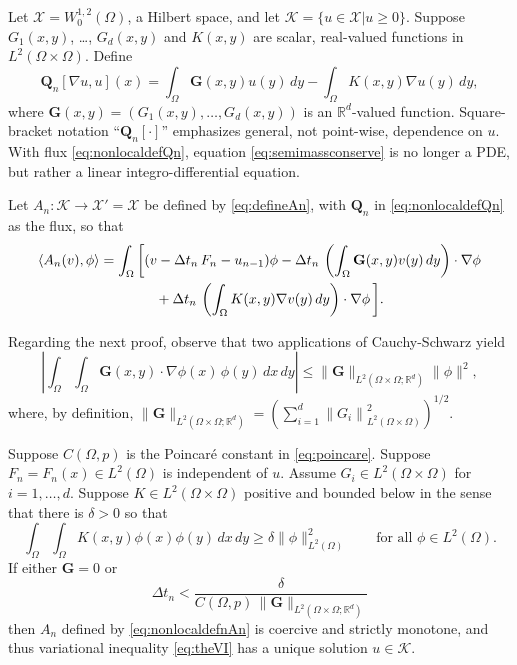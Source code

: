 \documentclass[final,onefignum]{siamart190516}
\newcommand\bG{\mathbf{G}}
\newcommand\bQ{\mathbf{Q}}
\newcommand{\grad}{\nabla}
\newcommand{\ip}[2]{\ensuremath{\left<#1,#2\right>}}
\newcommand\RR{\mathbb{R}}
\begin{document}
Let $\mathcal{X} = W_0^{1,2}(\Omega)$, a Hilbert space, and let $\mathcal{K}=\{u\in\mathcal{X}|u\ge 0\}$.  Suppose $G_1(x,y)$, \dots, $G_d(x,y)$ and $K(x,y)$ are scalar, real-valued functions in $L^2(\Omega\times \Omega)$.  Define
\begin{equation}
\bQ_n[\grad u,u](x) = \int_\Omega \bG(x,y) u(y)\,dy - \int_\Omega K(x,y) \grad u(y)\,dy, \label{eq:nonlocaldefQn}
\end{equation}
where $\bG(x,y) = (G_1(x,y), \dots, G_d(x,y))$ is an $\RR^d$-valued function.  Square-bracket notation ``$\bQ_n[\cdot]$'' emphasizes general, not point-wise, dependence on $u$.  With flux \eqref{eq:nonlocaldefQn}, equation \eqref{eq:semimassconserve} is no longer a PDE, but rather a linear integro-differential equation.

Let $A_n:\mathcal{K} \to \mathcal{X}'=\mathcal{X}$ be defined by \eqref{eq:defineAn}, with $\bQ_n$ in \eqref{eq:nonlocaldefQn} as the flux, so that
\begin{align}
    \ip{A_n(v)}{\phi} &= \int_\Omega \bigg[(v - \Delta t_n\,F_n - u_{n-1})\phi - \Delta t_n\,\left(\int_\Omega \bG(x,y) v(y)\,dy\right)\cdot \grad \phi \label{eq:nonlocaldefnAn} \\
                      &\qquad\qquad + \Delta t_n\,\left(\int_\Omega K(x,y) \grad v(y)\,dy\right)\cdot \grad \phi\,\bigg]. \notag
\end{align}

Regarding the next proof, observe that two applications of Cauchy-Schwarz yield
\begin{equation}
\left|\int_\Omega \int_\Omega \bG(x,y) \cdot \grad \phi(x)\,\phi(y) \,dx\,dy\right|
  \le \|\bG\|_{L^2(\Omega\times\Omega;\RR^d)} \|\phi\|^2,   \label{eq:nonlocalGbound}
\end{equation}
where, by definition, $\|\bG\|_{L^2(\Omega\times\Omega;\RR^d)} = \left(\sum_{i=1}^d \left\|G_i\right\|_{L^2(\Omega \times \Omega)}^2\right)^{1/2}$.

\begin{theorem}  \label{thm:nonlocalwellposed}  Suppose $C(\Omega,p)$ is the Poincar\'e constant in \eqref{eq:poincare}.  Suppose $F_n=F_n(x) \in L^2(\Omega)$ is independent of $u$.  Assume $G_i \in L^2(\Omega\times\Omega)$ for $i=1,\dots,d$.  Suppose $K \in L^2(\Omega\times\Omega)$ positive and bounded below \cite{PorterStirling1990} in the sense that there is $\delta>0$ so that
\begin{equation}
   \int_\Omega \int_\Omega K(x,y) \phi(x) \phi(y)\,dx\,dy \ge \delta \|\phi\|_{L^2(\Omega)}^2 \qquad \text{for all } \phi \in L^2(\Omega).  \label{eq:nonlocalKpos}
\end{equation}
If either $\bG=0$ or
\begin{equation}
  \Delta t_n < \frac{\delta}{C(\Omega,p)\, \|\bG\|_{L^2(\Omega\times\Omega;\RR^d)}}  \label{eq:nonlocaldtcond}
\end{equation}
then $A_n$ defined by \eqref{eq:nonlocaldefnAn} is coercive and strictly monotone, and thus variational inequality \eqref{eq:theVI} has a unique solution $u\in\mathcal{K}$.
\end{theorem}
\end{document}
